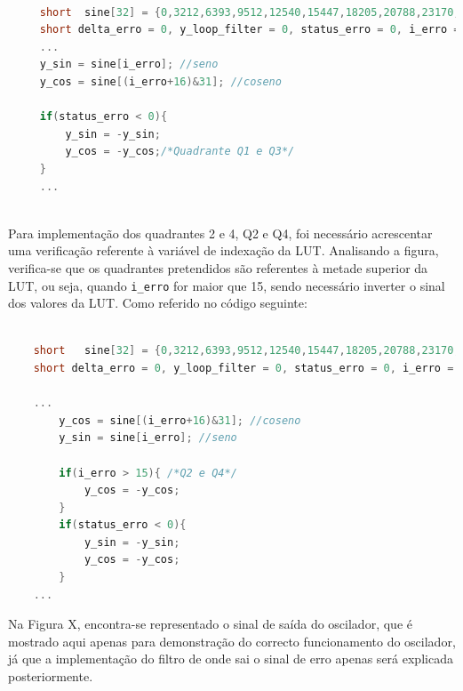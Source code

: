 \documentclass[11pt]{article}
\numberwithin{equation}{section}
\begin{document}
 \begin{lstlisting}[language=C]
 
	 short	sine[32] = {0,3212,6393,9512,12540,15447,18205,20788,23170,25330,27246,28899,30274,31357,		32138,32610,32767,32610,32138,31357,30274,28899,27246,25330,23170,20788,18205,		15447,12540,9512,6393,3212}; 
	 short delta_erro = 0, y_loop_filter = 0, status_erro = 0, i_erro = 0, y_sin = 0,y_coseno = 0;
	 ...
	 y_sin = sine[i_erro]; //seno
	 y_cos = sine[(i_erro+16)&31]; //coseno
	 
	 if(status_erro < 0){
		 y_sin = -y_sin;
		 y_cos = -y_cos;/*Quadrante Q1 e Q3*/
	 }	
	 ...
 
 \end{lstlisting}
 
  Para implementação dos quadrantes 2 e 4, Q2 e Q4, foi necessário acrescentar uma verificação referente à variável de	indexação da LUT. Analisando a figura, verifica-se que os quadrantes pretendidos são referentes à metade superior da LUT, ou seja, quando \texttt{i\_erro} for maior que 15, sendo necessário inverter o sinal dos valores da LUT. Como referido no código seguinte:
  
\begin{lstlisting}[language=C]

	short	sine[32] = {0,3212,6393,9512,12540,15447,18205,20788,23170,25330,27246,28899,30274,31357,		32138,32610,32767,32610,32138,31357,30274,28899,27246,25330,23170,20788,18205,	15447,12540,9512,6393,3212}; 
	short delta_erro = 0, y_loop_filter = 0, status_erro = 0, i_erro = 0, y_cos = 0, y_sin;

	...
		y_cos = sine[(i_erro+16)&31]; //coseno
		y_sin = sine[i_erro]; //seno

		if(i_erro > 15){ /*Q2 e Q4*/
			y_cos = -y_cos;
		}
		if(status_erro < 0){
			y_sin = -y_sin;
			y_cos = -y_cos;
		}	
	...
\end{lstlisting}

Na Figura X, encontra-se representado o sinal de saída do oscilador, que é mostrado aqui apenas para demonstração do correcto funcionamento do oscilador, já que a implementação do filtro de onde sai o sinal de erro apenas será explicada posteriormente. 
\end{document}
